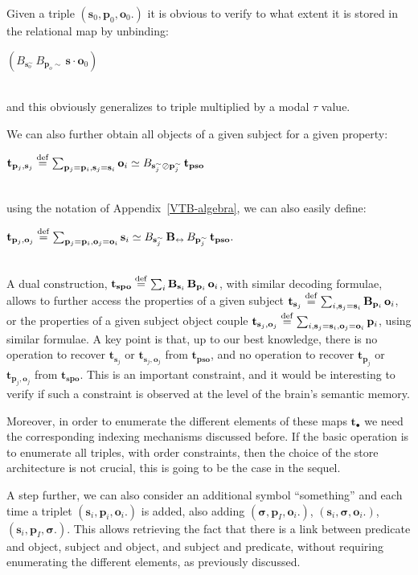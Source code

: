 \documentclass[sn-mathphys]{sn-jnl}
\newcommand{\defq}{\stackrel {\rm def}{=}}
\newcommand{\eqline}[1]{~\vspace{0.1cm}\\\centerline{$#1$}\vspace{0.1cm}\\}
\begin{document}
Given a triple $(\mathbf{s}_0 ,  \mathbf{p}_0 ,  \mathbf{o}_0.)$ it is obvious to verify to what extent it is stored in the relational map by unbinding:
\eqline{(B_{\mathbf{s}_o^\sim} \, B_{\mathbf{p}_o\sim} \, \mathbf{s} \cdot \mathbf{o}_0)}
and this obviously generalizes to triple multiplied by a modal $\tau$ value.

We can also further obtain all objects of a given subject for a given property:
\eqline{\mathbf{t}_{\mathbf{p}_j, \mathbf{s}_j} \defq \sum_{\mathbf{p}_j = \mathbf{p}_i, \mathbf{s}_j = \mathbf{s}_i} \mathbf{o}_i \simeq B_{\mathbf{s}_j^\sim \oslash \mathbf{p}_j^\sim} \, \mathbf{t}_{\mathbf{pso}} }
using the notation of Appendix~\ref{VTB-algebra}, we can also easily define:
\eqline{\mathbf{t}_{\mathbf{p}_j, \mathbf{o}_j}  \defq \sum_{\mathbf{p}_j
  = \mathbf{p}_i, \mathbf{o}_j = \mathbf{o}_i} \mathbf{s}_i
  \simeq B_{\mathbf{s}_j^\sim} \, \mathbf{B_{\leftrightarrow}} \, B_{\mathbf{p}_j^\sim} \, \mathbf{t}_{\mathbf{pso}}.}

A dual construction, $\mathbf{t}_{\mathbf{spo}} \defq \sum_i \mathbf{B}_{\mathbf{s}_i} \, \mathbf{B}_{\mathbf{p}_i} \, \mathbf{o}_i$, with similar decoding formulae, allows to further access the properties of a given subject $\mathbf{t}_{\mathbf{s}_j} \defq \sum_{i, \mathbf{s}_j = \mathbf{s}_i} \mathbf{B}_{\mathbf{p}_i} \, \mathbf{o}_i$, or the properties of a given subject object couple $\mathbf{t}_{\mathbf{s}_j, \mathbf{o}_j} \defq \sum_{i, \mathbf{s}_j = \mathbf{s}_i, \mathbf{o}_j = \mathbf{o}_i} \mathbf{p}_i$, using similar formulae. A key point is that, up to our best knowledge, there is no operation to recover $\mathbf{t}_{\mathbf{s}_j}$ or $\mathbf{t}_{\mathbf{s}_j, \mathbf{o}_j}$ from $\mathbf{t}_{\mathbf{pso}}$, and no operation to recover $\mathbf{t}_{\mathbf{p}_j}$ or $\mathbf{t}_{\mathbf{p}_j, \mathbf{o}_j}$ from $\mathbf{t}_{\mathbf{spo}}$. This is an important constraint, and it would be interesting to verify if such a constraint is observed at the level of the brain's semantic memory.

Moreover, in order to enumerate the different elements of these maps $\mathbf{t}_{\bullet}$ we need the corresponding indexing mechanisms discussed before. If the basic operation is to enumerate all triples, with order constraints, then the choice of the store architecture is not crucial, this is going to be the case in the sequel.

A step further, we can also consider an additional symbol ``something'' and each time a triplet $(\mathbf{s}_i,  \mathbf{p}_i,  \mathbf{o}_i.)$ is added, also adding $(\mathbf{\sigma},  \mathbf{p}_I,  \mathbf{o}_i.)$, $(\mathbf{s}_i ,  \mathbf{\sigma} ,  \mathbf{o}_i.)$, $(\mathbf{s}_i,  \mathbf{p}_I,  \mathbf{\sigma}.)$. This allows retrieving the fact that there is a link between predicate and object, subject and object, and subject and predicate, without requiring enumerating the different elements, as previously discussed.
\end{document}
